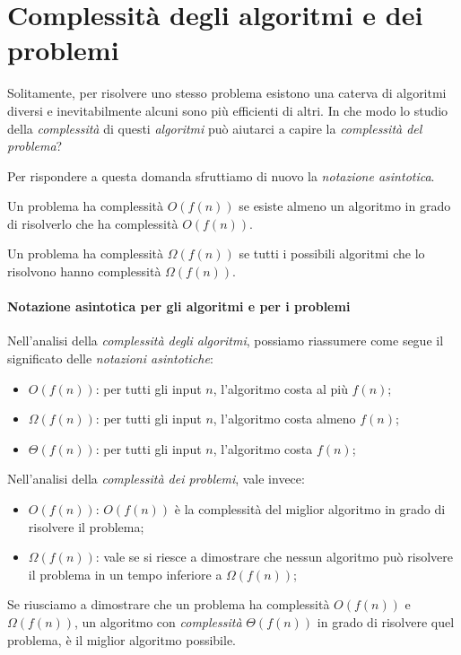 \section{Complessità degli algoritmi e dei problemi}
Solitamente, per risolvere uno stesso problema esistono una caterva di algoritmi
diversi e inevitabilmente alcuni sono più efficienti di altri. In che modo
lo studio della \emph{complessità} di questi \emph{algoritmi} può aiutarci a
capire la \emph{complessità del problema}?

Per rispondere a questa domanda sfruttiamo di nuovo la \emph{notazione
asintotica}.

\begin{definition}[Notazione $O$]
    Un problema ha complessità $O(f(n))$ se esiste almeno un algoritmo in grado
    di risolverlo che ha complessità $O(f(n))$.
\end{definition}

\begin{definition}
    Un problema ha complessità $\Omega(f(n))$ se tutti i possibili algoritmi che
    lo risolvono hanno complessità $\Omega(f(n))$.
\end{definition}

\paragraph{Notazione asintotica per gli algoritmi e per i problemi}
Nell'analisi della \emph{complessità degli algoritmi}, possiamo riassumere come
segue il significato delle \emph{notazioni asintotiche}:
\begin{itemize}
    \item $O(f(n))$: per tutti gli input $n$, l'algoritmo costa al più $f(n)$;
    \item $\Omega(f(n))$: per tutti gli input $n$, l'algoritmo costa almeno $f(n)$;
    \item $\Theta(f(n))$: per tutti gli input $n$, l'algoritmo costa $f(n)$;
\end{itemize}
Nell'analisi della \emph{complessità dei problemi}, vale invece:
\begin{itemize}
    \item $O(f(n))$: $O(f(n))$ è la complessità del miglior algoritmo in grado
    di risolvere il problema;
    \item $\Omega(f(n))$: vale se si riesce a dimostrare che nessun algoritmo
    può risolvere il problema in un tempo inferiore a $\Omega(f(n))$;
\end{itemize}
Se riusciamo a dimostrare che un problema ha complessità $O(f(n))$ e $\Omega(f(n))$,
un algoritmo con \emph{complessità} $\Theta(f(n))$ in grado di risolvere
quel problema, è il miglior algoritmo possibile.

